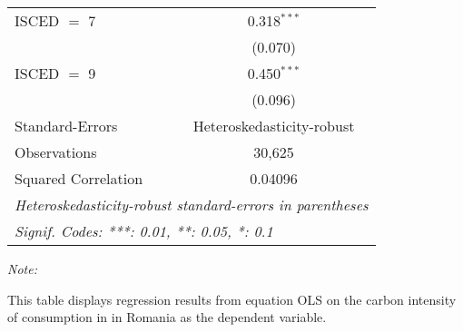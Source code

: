 \begin{table}[htbp!]
\begin{adjustbox}{width = 1\textwidth, max height = 0.95\textheight, center}
\begin{threeparttable}[b]
\begin{tabular}{lc}
            ISCED $=$ 7         & 0.318$^{***}$\\   
                                & (0.070)\\   
            ISCED $=$ 9         & 0.450$^{***}$\\   
                                & (0.096)\\   
            \midrule 
            Standard-Errors     & Heteroskedasticity-robust \\   
            Observations        & 30,625\\  
            Squared Correlation & 0.04096\\  
            \midrule \midrule
            \multicolumn{2}{l}{\emph{Heteroskedasticity-robust standard-errors in parentheses}}\\
            \multicolumn{2}{l}{\emph{Signif. Codes: ***: 0.01, **: 0.05, *: 0.1}}\\
         \end{tabular}
         
         \begin{tablenotes}\item \medskip \textit{Note:}
            \item This table displays regression results from equation OLS on the carbon intensity of consumption in  in Romania as the dependent variable. 
         \end{tablenotes}
      \end{threeparttable}
   \end{adjustbox}
\end{table}


